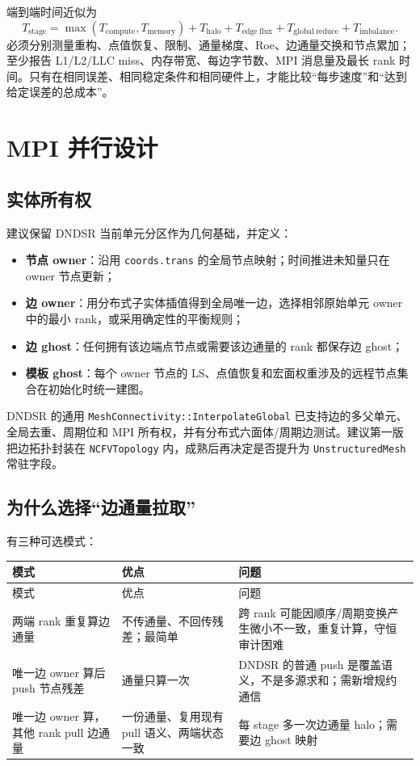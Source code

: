 \documentclass[UTF8,a4paper,11pt,openany]{ctexrep}
\numberwithin{equation}{chapter}
\newcommand{\code}[1]{\texttt{#1}}
\newcommand{\pathcode}[1]{\nolinkurl{#1}}
\begin{document}
端到端时间近似为
\begin{equation}
 T_{\mathrm{stage}}=\max(T_{\mathrm{compute}},T_{\mathrm{memory}})
 +T_{\mathrm{halo}}+T_{\mathrm{edge\ flux}}+T_{\mathrm{global\ reduce}}+T_{\mathrm{imbalance}}.
\end{equation}
必须分别测量重构、点值恢复、限制、通量梯度、Roe、边通量交换和节点累加；至少报告 L1/L2/LLC miss、内存带宽、每边字节数、MPI 消息量及最长 rank 时间。只有在相同误差、相同稳定条件和相同硬件上，才能比较“每步速度”和“达到给定误差的总成本”。

\chapter{MPI 并行设计}

\section{实体所有权}

建议保留 DNDSR 当前单元分区作为几何基础，并定义：

\begin{itemize}
  \item \textbf{节点 owner}：沿用 \code{coords.trans} 的全局节点映射；时间推进未知量只在 owner 节点更新；
  \item \textbf{边 owner}：用分布式子实体插值得到全局唯一边，选择相邻原始单元 owner 中的最小 rank，或采用确定性的平衡规则；
  \item \textbf{边 ghost}：任何拥有该边端点节点或需要该边通量的 rank 都保存边 ghost；
  \item \textbf{模板 ghost}：每个 owner 节点的 LS、点值恢复和宏面权重涉及的远程节点集合在初始化时统一建图。
\end{itemize}

DNDSR 的通用 \pathcode{MeshConnectivity::InterpolateGlobal} 已支持边的多父单元、全局去重、周期位和 MPI 所有权，并有分布式六面体/周期边测试。建议第一版把边拓扑封装在 \pathcode{NCFVTopology} 内，成熟后再决定是否提升为 \code{UnstructuredMesh} 常驻字段。

\section{为什么选择“边通量拉取”}

有三种可选模式：

\begin{longtable}{>{\raggedright\arraybackslash}p{}p{}p{}}
\toprule
模式 & 优点 & 问题\\
\midrule
\endfirsthead
\toprule
模式 & 优点 & 问题\\
\midrule
\endhead
两端 rank 重复算边通量 & 不传通量、不回传残差；最简单 & 跨 rank 可能因顺序/周期变换产生微小不一致，重复计算，守恒审计困难\\
唯一边 owner 算后 push 节点残差 & 通量只算一次 & DNDSR 的普通 push 是覆盖语义，不是多源求和；需新增规约通信\\
唯一边 owner 算，其他 rank pull 边通量 & 一份通量、复用现有 pull 语义、两端状态一致 & 每 stage 多一次边通量 halo；需要边 ghost 映射\\
\bottomrule
\end{longtable}
\end{document}
